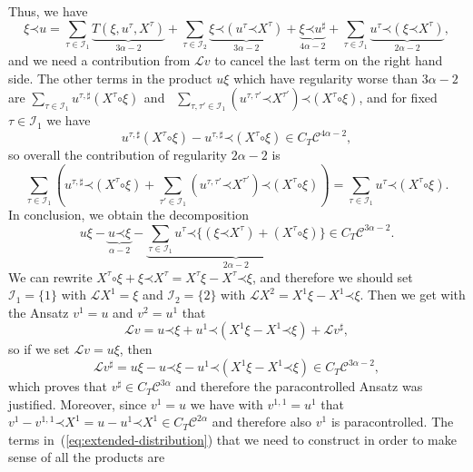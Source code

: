 \documentclass[a4paper, 11pt]{article}
\newcommand{\LL}{\mathcal{L}}
\newcommand{\para}{\mathord{\prec}}
\newcommand{\reso}{\mathord{\circ}}
\begin{document}
Thus, we have
\[ \xi \para u = \sum_{\tau \in \mathcal{I}_1} \underbrace{T (\xi, u^{\tau},
   X^{\tau})}_{3 \alpha - 2} + \sum_{\tau \in \mathcal{I}_2} \underbrace{\xi
   \para (u^{\tau} \para X^{\tau})}_{3 \alpha - 2} + \underbrace{\xi \para
   u^{\sharp}}_{4 \alpha - 2} + \sum_{\tau \in \mathcal{I}_1}
   \underbrace{u^{\tau} \para (\xi \para X^{\tau})}_{2 \alpha - 2}, \]
and we need a contribution from $\LL v$ to cancel the last term on the right hand
side. The other terms in the product $u \xi$ which have regularity worse than
$3 \alpha - 2$ are $\sum_{\tau \in \mathcal{I}_1} u^{\tau, \sharp} (X^{\tau}
\reso \xi)_{}$ and \ $\sum_{\tau, \tau' \in \mathcal{I}_1} (u^{\tau, \tau'}
\para X^{\tau'}) \para (X^{\tau} \reso \xi)$, and for fixed $\tau \in
\mathcal{I}_1$ we have
\[ u^{\tau, \sharp} (X^{\tau} \reso \xi) - u^{\tau, \sharp} \para (X^{\tau}
   \reso \xi) \in C_T \mathcal{C}^{4 \alpha - 2}, \]
so overall the contribution of regularity $2 \alpha - 2$ is
\[ \sum_{\tau \in \mathcal{I}_1} \left( u^{\tau, \sharp} \para (X^{\tau} \reso
   \xi) + \sum_{\tau' \in \mathcal{I}_1} (u^{\tau, \tau'} \para X^{\tau'})
   \para (X^{\tau} \reso \xi) \right) = \sum_{\tau \in \mathcal{I}_1} u^{\tau}
   \para (X^{\tau} \reso \xi) . \]
In conclusion, we obtain the decomposition
\[ u \xi - \underbrace{u \para \xi}_{\alpha - 2} - \underbrace{\sum_{\tau \in
   \mathcal{I}_1} u^{\tau} \para \{ (\xi \para X^{\tau}) + (X^{\tau} \reso
   \xi) \}}_{2 \alpha - 2} \in C_T \mathcal{C}^{3 \alpha - 2} . \]
We can rewrite $X^{\tau} \reso \xi + \xi \para X^{\tau} = X^{\tau} \xi -
X^{\tau} \para \xi$, and therefore we should set $\mathcal{I}_1 = \{ 1
\}$ with $\mathcal{L}X^{1} = \xi$ and $\mathcal{I}_2 = \{ 2 \}$ with
$\mathcal{L}X^{2} = X^{1} \xi - X^{1} \para \xi$. Then we get
with the Ansatz $v^{1} = u$ and $v^{2} = u^{1}$ that
\[ \mathcal{L}v = u \para \xi + u^{1} \para (X^{1} \xi - X^{1}
   \para \xi) +\mathcal{L}v^{\sharp}, \]
so if we set $\mathcal{L}v = u \xi$, then
\[ \mathcal{L}v^{\sharp} = u \xi - u \para \xi - u^{1} \para (X^{1}
   \xi - X^{1} \para \xi) \in C_T \mathcal{C}^{3 \alpha - 2}, \]
which proves that $v^{\sharp} \in C_T \mathcal{C}^{3 \alpha}$ and therefore
the paracontrolled Ansatz was justified. Moreover, since $v^{1} = u$ we
have with $v^{1, 1} = u^{1}$ that $v^{1} - v^{1,
1} \para X^{1} = u - u^{1} \para X^{1} \in C_T
\mathcal{C}^{2 \alpha}$ and therefore also $v^{1}$ is paracontrolled. The terms in~(\ref{eq:extended-distribution}) that we need to construct in order to make sense of all the products are
\end{document}
